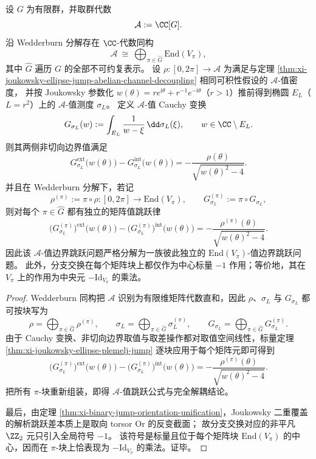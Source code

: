 \begin{theorem}\label{thm:conclusion-joukowsky-finite-group-wedderburn-decoupling}
设 \(G\) 为有限群，并取群代数
\[
\mathcal A:=\CC[G].
\]
沿 Wedderburn 分解存在 \(\CC\)-代数同构
\[
\mathcal A\ \cong\ \bigoplus_{\pi\in\widehat G}\mathrm{End}(V_\pi),
\]
其中 \(\widehat G\) 遍历 \(G\) 的全部不可约复表示。
设 \(\rho:[0,2\pi]\to\mathcal A\) 为满足与定理 \ref{thm:xi-joukowsky-ellipse-jump-abelian-channel-decoupling} 相同可积性假设的 \(\mathcal A\)-值密度，
并按 Joukowsky 参数化 \(w(\theta)=r e^{\mathrm i\theta}+r^{-1}e^{-\mathrm i\theta}\)（\(r>1\)）推前得到椭圆 \(E_L\)（\(L=r^2\)）上的 \(\mathcal A\)-值测度 \(\sigma_L\)。
定义 \(\mathcal A\)-值 Cauchy 变换
\[
G_{\sigma_L}(w):=\int_{E_L}\frac{1}{w-\xi}\,\dd\sigma_L(\xi),
\qquad
w\in\CC\setminus E_L.
\]
则其两侧非切向边界值满足
\[
G_{\sigma_L}^{\mathrm{ext}}\!\bigl(w(\theta)\bigr)-G_{\sigma_L}^{\mathrm{int}}\!\bigl(w(\theta)\bigr)
=
-\frac{\rho(\theta)}{\sqrt{w(\theta)^2-4}}.
\]
并且在 Wedderburn 分解下，若记
\[
\rho^{(\pi)}:=\pi\circ\rho:[0,2\pi]\to \mathrm{End}(V_\pi),
\qquad
G_{\sigma_L}^{(\pi)}:=\pi\circ G_{\sigma_L},
\]
则对每个 \(\pi\in\widehat G\) 都有独立的矩阵值跳跃律
\[
\bigl(G_{\sigma_L}^{(\pi)}\bigr)^{\mathrm{ext}}\!\bigl(w(\theta)\bigr)
-\bigl(G_{\sigma_L}^{(\pi)}\bigr)^{\mathrm{int}}\!\bigl(w(\theta)\bigr)
=
-\frac{\rho^{(\pi)}(\theta)}{\sqrt{w(\theta)^2-4}}.
\]
因此该 \(\mathcal A\)-值边界跳跃问题严格分解为一族彼此独立的 \(\mathrm{End}(V_\pi)\)-值边界跳跃问题。
此外，分支交换在每个矩阵块上都仅作为中心标量 \(-1\) 作用；等价地，其在 \(V_\pi\) 上的作用为中央元 \(-\mathrm{Id}_{V_\pi}\) 的乘法。
\end{theorem}
\begin{proof}
Wedderburn 同构把 \(\mathcal A\) 识别为有限维矩阵代数直和，因此 \(\rho\)、\(\sigma_L\) 与 \(G_{\sigma_L}\) 都可按块写为
\[
\rho=\bigoplus_{\pi\in\widehat G}\rho^{(\pi)},
\qquad
\sigma_L=\bigoplus_{\pi\in\widehat G}\sigma_L^{(\pi)},
\qquad
G_{\sigma_L}=\bigoplus_{\pi\in\widehat G}G_{\sigma_L}^{(\pi)}.
\]
由于 Cauchy 变换、非切向边界取值与取差操作都对取值空间线性，标量定理 \ref{thm:xi-joukowsky-ellipse-plemelj-jump} 逐块应用于每个矩阵元即可得到
\[
\bigl(G_{\sigma_L}^{(\pi)}\bigr)^{\mathrm{ext}}\!\bigl(w(\theta)\bigr)
-\bigl(G_{\sigma_L}^{(\pi)}\bigr)^{\mathrm{int}}\!\bigl(w(\theta)\bigr)
=
-\frac{\rho^{(\pi)}(\theta)}{\sqrt{w(\theta)^2-4}}.
\]
把所有 \(\pi\)-块重新组装，即得 \(\mathcal A\)-值跳跃公式与完全解耦结论。

最后，由定理 \ref{thm:xi-binary-jump-orientation-unification}，Joukowsky 二重覆盖的解析跳跃差本质上是取向 torsor \(\mathrm{Or}\) 的反变截面；
故分支交换对应的非平凡 \(\ZZ_2\) 元只引入全局符号 \(-1\)。
该符号是标量且位于每个矩阵块 \(\mathrm{End}(V_\pi)\) 的中心，因而在 \(\pi\)-块上恰表现为 \(-\mathrm{Id}_{V_\pi}\) 的乘法。证毕。
\end{proof}


